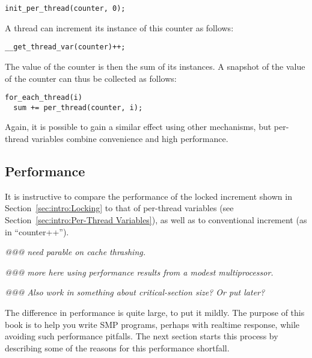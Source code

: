 \vspace{5pt}
\begin{minipage}[t]{\columnwidth}
\small 
\begin{verbatim}
init_per_thread(counter, 0);
\end{verbatim}
\end{minipage} 
\vspace{5pt}

A thread can increment its instance of this counter as follows:

\vspace{5pt}
\begin{minipage}[t]{\columnwidth}
\small 
\begin{verbatim}
__get_thread_var(counter)++;
\end{verbatim}
\end{minipage} 
\vspace{5pt}

The value of the counter is then the sum of its instances.
A snapshot of the value of the counter can thus be collected
as follows:

\vspace{5pt}
\begin{minipage}[t]{\columnwidth}
\small 
\begin{verbatim}
for_each_thread(i)
  sum += per_thread(counter, i);
\end{verbatim}
\end{minipage} 
\vspace{5pt}

Again, it is possible to gain a similar effect using other mechanisms,
but per-thread variables combine convenience and high performance.

\subsection{Performance}
\label{sec:intro:Performance}

It is instructive to compare the performance of the locked increment
shown in
Section~\ref{sec:intro:Locking}
to that of per-thread variables
(see Section~\ref{sec:intro:Per-Thread Variables}),
as well as to conventional increment (as in ``counter++'').

\emph{@@@ need parable on cache thrashing.}

\emph{@@@ more here using performance results from a modest multiprocessor.}

\emph{@@@ Also work in something about critical-section size? Or put later?}

The difference in performance is quite large, to put it mildly.
The purpose of this book is to help you write SMP programs,
perhaps with realtime response, while avoiding such performance
pitfalls.
The next section starts this process by describing some of the
reasons for this performance shortfall.
